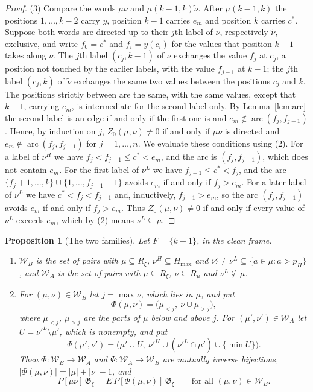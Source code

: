 \documentclass[11pt]{article}
\newtheorem{proposition}{Proposition}
\newcommand{\G}{\mathfrak{G}}
\begin{document}
\begin{proof}
(3) Compare the words $\mu\nu$ and $\mu(k-1,k)\tilde\nu$. After
$\mu(k-1,k)$ the positions $1,\ldots,k-2$ carry $y$, position $k-1$
carries $e_m$ and position $k$ carries $c^\ast$. Suppose both words are
directed up to their $j$th label of $\nu$, respectively $\tilde\nu$,
exclusive, and write $f_0=c^\ast$ and $f_i=y(c_i)$ for the values that
position $k-1$ takes along $\nu$. The $j$th label $(c_j,k-1)$ of $\nu$
exchanges the value $f_j$ at $c_j$, a position not touched by the
earlier labels, with the value $f_{j-1}$ at $k-1$; the $j$th label
$(c_j,k)$ of $\tilde\nu$ exchanges the same two values between the
positions $c_j$ and $k$. The positions strictly between are the same,
with the same values, except that $k-1$, carrying $e_m$, is
intermediate for the second label only. By Lemma~\ref{lem:arc} the
second label is an edge if and only if the first one is and
$e_m\notin\operatorname{arc}(f_j,f_{j-1})$. Hence, by induction on
$j$, $Z_0(\mu,\nu)\neq0$
if and only if $\mu\nu$ is directed and
$e_m\notin\operatorname{arc}(f_j,f_{j-1})$ for $j=1,\ldots,n$. We
evaluate these conditions using (2). For a label of $\nu^H$ we have
$f_j<f_{j-1}\leq c^\ast<e_m$, and the arc is $(f_j,f_{j-1})$, which
does not contain $e_m$. For the first label of $\nu^L$ we have
$f_{j-1}\leq c^\ast<f_j$, and the arc $\{f_j+1,\ldots,k\}\cup\{1,\ldots,f_{j-1}-1\}$
avoids $e_m$ if and only if $f_j>e_m$. For a later label of $\nu^L$ we
have $c^\ast<f_j<f_{j-1}$ and, inductively, $f_{j-1}>e_m$, so the arc
$(f_j,f_{j-1})$ avoids $e_m$ if and only if $f_j>e_m$. Thus
$Z_0(\mu,\nu)\neq0$ if and only if every value of $\nu^L$ exceeds
$e_m$, which by (2) means $\nu^L\subseteq\mu$.
\end{proof}

\begin{proposition}[The two families]\label{prop:families}
Let $F=\{k-1\}$, in the clean frame.
\begin{enumerate}
\item $\mathcal W_B$ is the set of pairs with $\mu\subseteq R_\xi$,
 $\nu^H\subseteq H_{\max}$ and $\varnothing\neq\nu^L\subseteq\{a\in\mu:a>p_H\}$,
 and $\mathcal W_A$ is the set of pairs with $\mu\subseteq R_\xi$,
 $\nu\subseteq R_\mu$ and $\nu^L\not\subseteq\mu$.
\item For $(\mu,\nu)\in\mathcal W_B$ let $j=\max\nu$, which lies in
 $\mu$, and put
 \[
  \Phi(\mu,\nu)=\bigl(\mu_{<j},\ \nu\cup\mu_{>j}\bigr),
 \]
 where $\mu_{<j}$, $\mu_{>j}$ are the parts of $\mu$ below and above
 $j$. For $(\mu',\nu')\in\mathcal W_A$ let $U=\nu'^L\setminus\mu'$,
 which is nonempty, and put
 \[
  \Psi(\mu',\nu')=\bigl(\mu'\cup U,\ \nu'^H\cup(\nu'^L\cap\mu')\cup\{\min U\}\bigr).
 \]
 Then $\Phi\colon\mathcal W_B\to\mathcal W_A$ and
 $\Psi\colon\mathcal W_A\to\mathcal W_B$ are mutually inverse
 bijections, $|\Phi(\mu,\nu)|=|\mu|+|\nu|-1$, and
 \[
  P[\mu\nu]\,\G_\xi=E\,P[\Phi(\mu,\nu)]\,\G_\xi
  \qquad\text{for all }(\mu,\nu)\in\mathcal W_B .
 \]
\end{enumerate}
\end{proposition}
\end{document}
